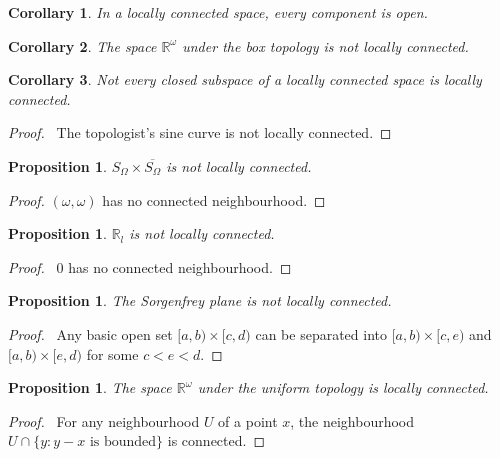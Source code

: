 \documentclass{report}
\let\qed\relax
\newtheorem{prop}[lm]{Proposition}
\newtheorem{cor}{Corollary}[lm]
\theoremstyle{definition}
\begin{document}
  \begin{cor}
   In a locally connected space, every component is open.
  \end{cor}

  \begin{cor}
    The space $\mathbb{R}^\omega$ under the box topology is not locally
connected.
  \end{cor}

\begin{cor}
  Not every closed subspace of a locally connected space is locally connected.
\end{cor}

\begin{proof}
  \pf\ The topologist's sine curve is not locally connected. \qed
\end{proof}

   \begin{prop}
   $S_\Omega \times \overline{S_\Omega}$ is not locally connected.
 \end{prop}

 \begin{proof}
  $(\omega, \omega)$ has no connected neighbourhood. \qed
 \end{proof}

 \begin{prop}
   $\mathbb{R}_l$ is not locally connected.
 \end{prop}

 \begin{proof}
  \pf\ 0 has no connected neighbourhood. \qed
 \end{proof}

  \begin{prop}
  The Sorgenfrey plane is not locally connected.
 \end{prop}

 \begin{proof}
  \pf\ Any basic open set $[a,b) \times [c,d)$ can be separated into $[a,b)
\times [c,e)$ and $[a,b) \times [e,d)$ for some $c < e < d$. \qed
 \end{proof}

  \begin{prop}
   The space $\mathbb{R}^\omega$ under the uniform topology is locally
connected.
 \end{prop}

 \begin{proof}
   \pf\ For any neighbourhood $U$ of a point $x$, the neighbourhood $U \cap \{
   y : y - x \text{ is bounded} \}$ is connected. \qed
 \end{proof}
\end{document}
